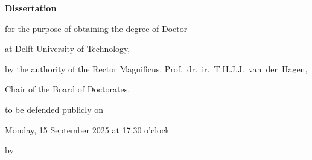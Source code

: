 \begin{titlepage}




\cleardoublepage
\thispagestyle{empty}

\begin{center}


\vspace*{2\bigskipamount}

{\makeatletter
\titlestyle\bfseries\LARGE\@title
\makeatother}

{\makeatletter
\ifx\@subtitle\undefined\else
    \bigskip
    \titlefont\titleshape\Large\@subtitle
\fi
\makeatother}

\vfill


{\Large\titlefont\bfseries Dissertation}

\bigskip
\bigskip

for the purpose of obtaining the degree of Doctor

at Delft University of Technology,

by the authority of the Rector Magnificus, Prof.~dr.~ir.~T.H.J.J.~van~der~Hagen,

Chair of the Board of Doctorates,

to be defended publicly on

Monday, 15 September 2025 at 17:30 o’clock

\bigskip
\bigskip

by

\bigskip
\bigskip

\makeatletter
{\Large\titlefont\bfseries\@firstname\ \titleshape{\MakeUppercase{\@lastname}}}
\makeatother


\end{center}
\end{titlepage}
